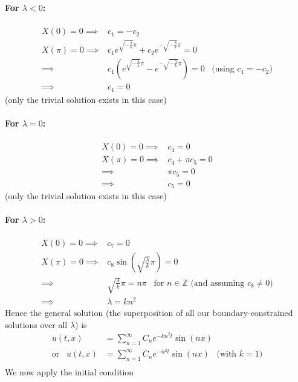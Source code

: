 \documentclass[12pt]{article}
\begin{document}
\begin{enumerate}[(a)]
{\textbf{For $\lambda < 0$:} \\ \\
\begin{align*}
X(0) = 0 \implies& \boxed{c_1 = -c_2} \\
X(\pi) = 0 \implies& c_1 e^{\sqrt{-\frac{\lambda}{k}} \pi} + c_2 e^{-\sqrt{-\frac{\lambda}{k}} \pi} = 0 \\
\implies& c_1 \left(e^{\sqrt{-\frac{\lambda}{k}} \pi} - e^{-\sqrt{-\frac{\lambda}{k}} \pi} \right) = 0 \;\;\; \text{(using $c_1 = -c_2$)} \\
\implies& \boxed{c_1 = 0}
\end{align*}
(only the trivial solution exists in this case) \\ \\
\textbf{For $\lambda = 0$:} \\ \\
\begin{align*}
X(0) = 0 \implies& \boxed{c_4 = 0} \\
X(\pi) = 0 \implies& c_4 + \pi c_5 = 0 \\
\implies& \pi c_5 = 0 \\
\implies& \boxed{c_5 = 0}
\end{align*}
(only the trivial solution exists in this case) \\ \\
\textbf{For $\lambda > 0$:} \\ \\
\begin{align*}
X(0) = 0 \implies& \boxed{c_7 = 0}\\
X(\pi) = 0 \implies& c_8 \sin \left( \sqrt{\frac{\lambda}{k}} \pi \right) = 0\\
\implies& \sqrt{\frac{\lambda}{k}} \pi = n\pi \;\;\; \text{for $n \in \mathbb{Z}$ (and assuming $c_8 \neq 0$)} \\
\implies& \lambda = kn^2
\end{align*}
Hence the general solution (the superposition of all our boundary-constrained solutions over all $\lambda$) is 
\begin{align*}
u(t,x) &= \sum_{n=1}^{\infty} C_n e^{-kn^2 t} \sin \left( nx \right) \\
\text{or} \;\;\; u(t,x) &= \sum_{n=1}^{\infty} C_n e^{-n^2 t} \sin \left( nx \right) \;\;\; \text{(with $k=1$)} \\
\end{align*}
We now apply the initial condition \\
\begin{align*}

\end{align*}}
\end{enumerate}
\end{document}
